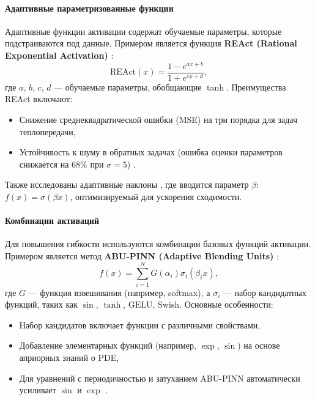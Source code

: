 \paragraph{Адаптивные параметризованные функции}
Адаптивные функции активации содержат обучаемые параметры, которые подстраиваются под данные. Примером является функция \textbf{REAct (Rational Exponential Activation)} \cite{0d752c79fb816703274a3d37f85a85689a2a9405}:
$$
\text{REAct}(x) = \frac{1 - e^{ax + b}}{1 + e^{cx + d}},
$$
где $a$, $b$, $c$, $d$ — обучаемые параметры, обобщающие $\tanh$. Преимущества REAct включают:
\begin{itemize}
    \item Снижение среднеквадратической ошибки (MSE) на три порядка для задач теплопередачи,
    \item Устойчивость к шуму в обратных задачах (ошибка оценки параметров снижается на 68\% при $\sigma=5$) \cite{0d752c79fb816703274a3d37f85a85689a2a9405}.
\end{itemize}

Также исследованы адаптивные наклоны \cite{7fcd4b3c875d8e41eb0c184aa1a42bf4c8906d61}, где вводится параметр $\beta$: $f(x) = \sigma(\beta x)$, оптимизируемый для ускорения сходимости.

\paragraph{Комбинации активаций}
Для повышения гибкости используются комбинации базовых функций активации. Примером является метод \textbf{ABU-PINN (Adaptive Blending Units)} \cite{Sutfeld2018-io}\cite{7fcd4b3c875d8e41eb0c184aa1a42bf4c8906d61}:
$$
f(x) = \sum_{i=1}^N G(\alpha_i) \sigma_i(\beta_i x),
$$
где $G$ — функция взвешивания (например, softmax), а $\sigma_i$ — набор кандидатных функций, таких как $\sin$, $\tanh$, $\mathrm{GELU}$, $\mathrm{Swish}$. Основные особенности:
\begin{itemize}
    \item Набор кандидатов включает функции с различными свойствами,
    \item Добавление элементарных функций (например, $\exp$, $\sin$) на основе априорных знаний о PDE,
    \item Для уравнений с периодичностью и затуханием ABU-PINN автоматически усиливает $\sin$ и $\exp$ \cite{7fcd4b3c875d8e41eb0c184aa1a42bf4c8906d61}.
\end{itemize}



